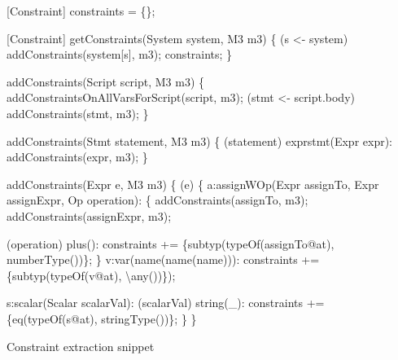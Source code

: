 \documentclass[../main.tex]{subfiles}
\begin{document}
    \begin{program}    
    \begin{rascal}%
 [Constraint] constraints = \{{}\}{};
    
 [Constraint] getConstraints(System system, M3 m3) \{{}
   (s \textless{}- system)
    addConstraints(system{}[s], m3);
   constraints;
\}{}
	
  addConstraints(Script script, M3 m3) \{{}
  addConstraintsOnAllVarsForScript(script, m3);
   (stmt \textless{}- script.body)
    addConstraints(stmt, m3);
\}{}

  addConstraints(Stmt statement, M3 m3) \{{}
    (statement)
     exprstmt(Expr expr): addConstraints(expr, m3);
\}{}

  addConstraints(Expr e, M3 m3) \{{}
    (e) \{{}
     a:assignWOp(Expr assignTo, Expr assignExpr, Op operation): \{{}
      addConstraints(assignTo, m3);
      addConstraints(assignExpr, m3);
            
      (operation)
         plus(): constraints += \{{}subtyp(typeOf(assignTo@at), numberType())\}{};
    \}{}
     v:var(name(name(name))):
      constraints += \{{}subtyp(typeOf(v@at), \textbackslash{}any())\}{});

     s:scalar(Scalar scalarVal):
      (scalarVal)
         string(\_{}): constraints += \{{}eq(typeOf(s@at), stringType())\}{};
  \}{}
\}{}    
\end{rascal}%
	
	\caption{Constraint extraction snippet}
	\label{fig:constraint_extraction}
	\end{program}
    
\end{document}
